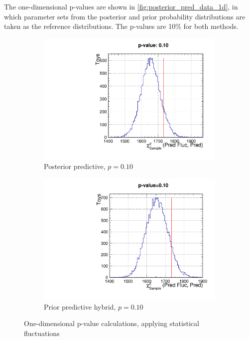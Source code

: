 The one-dimensional p-values are shown in \autoref{fig:posterior_pred_data_1d}, in which parameter sets from the posterior and prior probability distributions are taken as the reference distributions. The p-values are 10\% for both methods.
\begin{figure}[h]
	\begin{subfigure}[t]{0.49\textwidth}
		\includegraphics[width=\textwidth, trim={0mm 0mm 0mm 14mm}, clip,page=1]{figures/mach3/data/postpred/postpred_pvalue_1d}
		\caption{Posterior predictive, $p=0.10$}
	\end{subfigure}
	\begin{subfigure}[t]{0.49\textwidth}
		\includegraphics[width=\textwidth, trim={0mm 0mm 0mm 14mm}, clip,page=1]{figures/mach3/data/postpred/PriorPredictive_Hybrid}
		\caption{Prior predictive hybrid, $p=0.10$}
	\end{subfigure}
	\caption{One-dimensional p-value calculations, applying statistical fluctuations}
	\label{fig:posterior_pred_data_1d}
\end{figure}

